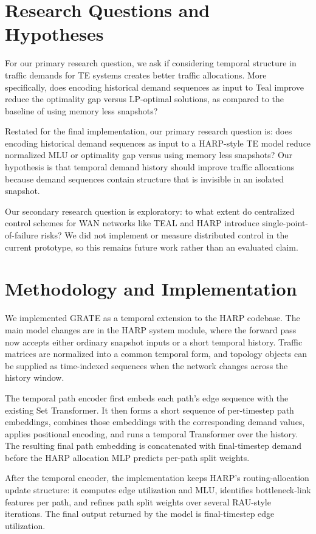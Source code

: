 \documentclass[letterpaper,twocolumn,10pt]{article}
\begin{document}
\section{Research Questions and Hypotheses}

For our primary research question, we ask if considering temporal structure in traffic demands for TE systems creates better traffic allocations. More specifically, does encoding historical demand sequences as input to Teal improve reduce the optimality gap versus LP-optimal solutions, as compared to the baseline of using memory less snapshots?

Restated for the final implementation, our primary research question is: does encoding historical demand sequences as input to a HARP-style TE model reduce normalized MLU or optimality gap versus using memory less snapshots? Our hypothesis is that temporal demand history should improve traffic allocations because demand sequences contain structure that is invisible in an isolated snapshot.

Our secondary research question is exploratory: to what extent do centralized control schemes for WAN networks like TEAL and HARP introduce single-point-of-failure risks? We did not implement or measure distributed control in the current prototype, so this remains future work rather than an evaluated claim.

\section{Methodology and Implementation}

We implemented GRATE as a temporal extension to the HARP codebase. The main model changes are in the HARP system module, where the forward pass now accepts either ordinary snapshot inputs or a short temporal history. Traffic matrices are normalized into a common temporal form, and topology objects can be supplied as time-indexed sequences when the network changes across the history window.

The temporal path encoder first embeds each path's edge sequence with the existing Set Transformer. It then forms a short sequence of per-timestep path embeddings, combines those embeddings with the corresponding demand values, applies positional encoding, and runs a temporal Transformer over the history. The resulting final path embedding is concatenated with final-timestep demand before the HARP allocation MLP predicts per-path split weights.

After the temporal encoder, the implementation keeps HARP's routing-allocation update structure: it computes edge utilization and MLU, identifies bottleneck-link features per path, and refines path split weights over several RAU-style iterations. The final output returned by the model is final-timestep edge utilization.
\end{document}
